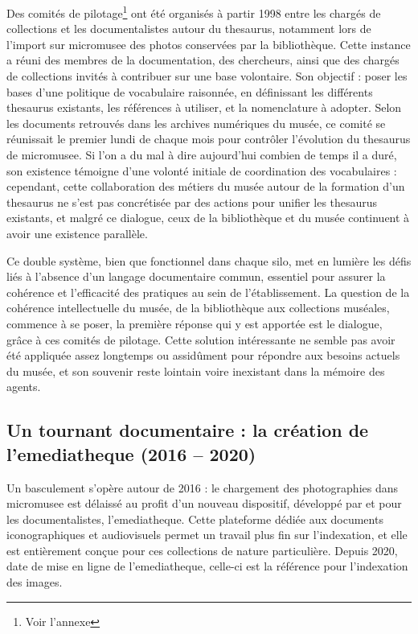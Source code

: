 Des comités de pilotage\footnote{Voir l'annexe } ont été organisés à partir 1998 entre les chargés de collections et les documentalistes autour du \gls{thesaurus}, notamment lors de l'import sur \gls{micromusee} des photos conservées par la bibliothèque. Cette instance a réuni des membres de la documentation, des chercheurs, ainsi que des chargés de collections invités à contribuer sur une base volontaire. Son objectif : poser les bases d'une politique de vocabulaire raisonnée, en définissant les différents \gls{thesaurus} existants, les références à utiliser, et la nomenclature à adopter. Selon les documents retrouvés dans les archives numériques du musée, ce comité se réunissait le premier lundi de chaque mois pour contrôler l'évolution du \gls{thesaurus} de \gls{micromusee}. Si l'on a du mal à dire aujourd'hui combien de temps il a duré, son existence témoigne d'une volonté initiale de coordination des vocabulaires : cependant, cette collaboration des métiers du musée autour de la formation d'un \gls{thesaurus} ne s'est pas concrétisée par des actions pour unifier les \gls{thesaurus} existants, et malgré ce dialogue, ceux de la bibliothèque et du musée continuent à avoir une existence parallèle.

Ce double système, bien que fonctionnel dans chaque silo, met en lumière les défis liés à l'absence d'un langage documentaire commun, essentiel pour assurer la cohérence et l'efficacité des pratiques au sein de l'établissement. La question de la cohérence intellectuelle du musée, de la bibliothèque aux collections muséales, commence à se poser, la première réponse qui y est apportée est le dialogue, grâce à ces comités de pilotage. Cette solution intéressante ne semble pas avoir été appliquée assez longtemps ou assidûment pour répondre aux besoins actuels du musée, et son souvenir reste lointain voire inexistant dans la mémoire des agents.

\subsection{Un tournant documentaire : la création de l'\gls{emediatheque} (2016 – 2020)}

Un basculement s'opère autour de 2016 : le chargement des photographies dans \gls{micromusee} est délaissé au profit d'un nouveau dispositif, développé par et pour les documentalistes, l'\gls{emediatheque}. Cette plateforme dédiée aux documents iconographiques et audiovisuels permet un travail plus fin sur l'indexation, et elle est entièrement conçue pour ces collections de nature particulière. Depuis 2020, date de mise en ligne de l'\gls{emediatheque}, celle-ci est la référence pour l'indexation des images.

